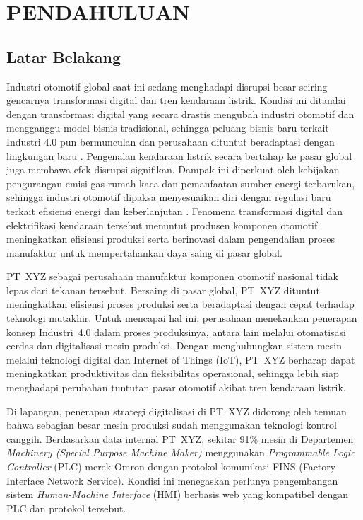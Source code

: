\chapter{PENDAHULUAN}

\section{Latar Belakang}

Industri otomotif global saat ini sedang menghadapi disrupsi besar seiring gencarnya transformasi digital dan tren kendaraan listrik. Kondisi ini ditandai dengan transformasi digital yang secara drastis mengubah industri otomotif dan mengganggu model bisnis tradisional, sehingga peluang bisnis baru terkait Industri 4.0 pun bermunculan dan perusahaan dituntut beradaptasi dengan lingkungan baru \parencite{llopis2020industry}. Pengenalan kendaraan listrik secara bertahap ke pasar global juga membawa efek disrupsi signifikan. Dampak ini diperkuat oleh kebijakan pengurangan emisi gas rumah kaca dan pemanfaatan sumber energi terbarukan, sehingga industri otomotif dipaksa menyesuaikan diri dengan regulasi baru terkait efisiensi energi dan keberlanjutan . Fenomena transformasi digital dan elektrifikasi kendaraan tersebut menuntut produsen komponen otomotif meningkatkan efisiensi produksi serta berinovasi dalam pengendalian proses manufaktur untuk mempertahankan daya saing di pasar global.

PT~XYZ sebagai perusahaan manufaktur komponen otomotif nasional tidak lepas dari tekanan tersebut. Bersaing di pasar global, PT~XYZ dituntut meningkatkan efisiensi proses produksi serta beradaptasi dengan cepat terhadap teknologi mutakhir. Untuk mencapai hal ini, perusahaan menekankan penerapan konsep Industri~4.0 dalam proses produksinya, antara lain melalui otomatisasi cerdas dan digitalisasi mesin produksi. Dengan menghubungkan sistem mesin melalui teknologi digital dan Internet of Things (IoT), PT~XYZ berharap dapat meningkatkan produktivitas dan fleksibilitas operasional, sehingga lebih siap menghadapi perubahan tuntutan pasar otomotif akibat tren kendaraan listrik.

Di lapangan, penerapan strategi digitalisasi di PT~XYZ didorong oleh temuan bahwa sebagian besar mesin produksi sudah menggunakan teknologi kontrol canggih. Berdasarkan data internal PT~XYZ, sekitar 91\% mesin di Departemen \textit{Machinery (Special Purpose Machine Maker)} menggunakan \textit{Programmable Logic Controller} (PLC) merek Omron dengan protokol komunikasi FINS (Factory Interface Network Service). Kondisi ini menegaskan perlunya pengembangan sistem \textit{Human-Machine Interface} (HMI) berbasis web yang kompatibel dengan PLC dan protokol tersebut.


